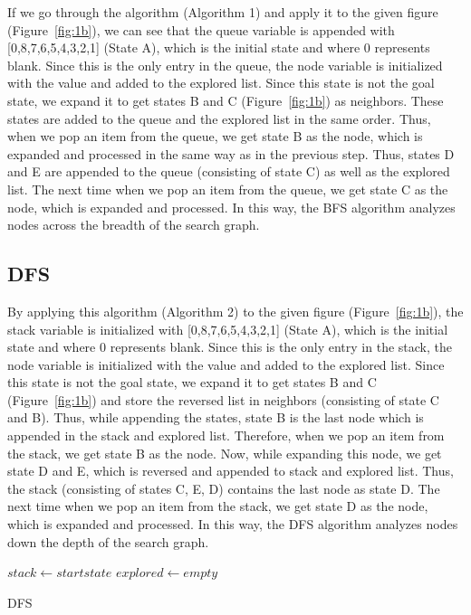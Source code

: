 \documentclass{svproc}
\begin{document}
\noindent If we go through the algorithm (Algorithm 1) and apply it to the given figure (Figure~\ref{fig:1b}), we can see that the queue variable is appended with [0,8,7,6,5,4,3,2,1] (State A), which is the initial state and where 0 represents blank. Since this is the only entry in the queue, the node variable is initialized with the value and added to the explored list. Since this state is not the goal state, we expand it to get states B and C (Figure~\ref{fig:1b}) as neighbors. These states are added to the queue and the explored list in the same order. Thus, when we pop an item from the queue, we get state B as the node, which is expanded and processed in the same way as in the previous step. Thus, states D and E are appended to the queue (consisting of state C) as well as the explored list. The next time when we pop an item from the queue, we get state C as the node, which is expanded and processed. In this way, the BFS algorithm analyzes nodes across the breadth of the search graph.

\subsection{DFS}
\setlength{\intextsep}{2pt}
\noindent By applying this algorithm (Algorithm 2) to the given figure (Figure~\ref{fig:1b}), the stack variable is initialized with [0,8,7,6,5,4,3,2,1] (State A), which is the initial state and where 0 represents blank. Since this is the only entry in the stack, the node variable is initialized with the value and added to the explored list. Since this state is not the goal state, we expand it to get states B and C (Figure~\ref{fig:1b}) and store the reversed list in neighbors (consisting of state C and B). Thus, while appending the states, state B is the last node which is appended in the stack and explored list. Therefore, when we pop an item from the stack, we get state B as the node. Now, while expanding this node, we get state D and E, which is reversed and appended to stack and explored list. Thus, the stack (consisting of states C, E, D) contains the last node as state D. The next time when we pop an item from the stack, we get state D as the node, which is expanded and processed. In this way, the DFS algorithm analyzes nodes down the depth of the search graph. 
\begin{algorithm}
	\SetAlgoLined
	$stack \gets start state$\;
	$explored \gets empty$\;
	\caption{DFS}
\end{algorithm}
\end{document}
